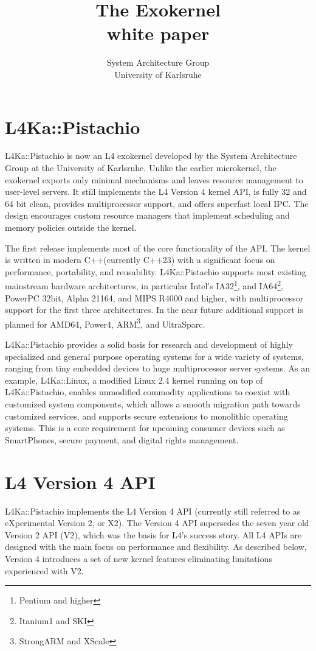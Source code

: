 \documentclass[twoside]{whitepaper}
\title{{\Huge The \Pistachio Exokernel}\\white paper}
\author{System Architecture Group\\University of Karlsruhe}
\newcommand{\Pistachio}{L4Ka::Pistachio\xspace}
\newcommand{\Lx}{L4Ka::Linux\xspace}
\begin{document}
\sffamily
\maketitle

\section{\Pistachio}

\Pistachio is now an L4 exokernel developed by the System
Architecture Group at the University of Karlsruhe.  Unlike the earlier
microkernel, the exokernel exports only minimal mechanisms and leaves
resource management to user-level servers.  It still implements the
L4 Version 4 kernel API, is fully 32 and 64 bit clean, provides
multiprocessor support, and offers superfast local IPC.  The design
encourages custom resource managers that implement scheduling and
memory policies outside the kernel.

The first release implements most of the core
functionality of the API.  The kernel is written in modern C++\@ (currently
C++23) with a significant focus on performance, portability, and reusability.
\Pistachio supports most existing mainstream hardware architectures,
in particular Intel's IA32\footnote{Pentium and higher}, and
IA64\footnote{Itanium1 and SKI}, PowerPC 32bit, Alpha 21164, and MIPS
R4000 and higher, with multiprocessor support for the first three
architectures.  In the near future additional support is planned for
AMD64, Power4, ARM\footnote{StrongARM and XScale}, and UltraSparc.

\Pistachio provides a solid basis for research and development of
highly specialized and general purpose operating systems for a wide
variety of systems, ranging from tiny embedded devices to huge
multiprocessor server systems.  As an example, \Lx, a modified Linux 2.4 kernel running on top of \Pistachio,
enables unmodified commodity applications to coexist with customized 
system components, which allows a smooth migration path towards customized
services, and supports secure extensions to monolithic operating systems.  
This is a core requirement for upcoming consumer devices such as
SmartPhones, secure payment, and digital rights management.


\section{L4 Version 4 API}
\Pistachio implements the L4 Version 4 API (currently still referred to
as eXperimental Version 2, or X2).  The Version 4 API supersedes the
seven year old Version 2 API (V2), which was the basis for L4's success
story.  All L4 APIs are designed with the main focus on performance
and flexibility.  As described below, Version 4 introduces a set of
new kernel features eliminating limitations experienced with V2.
\end{document}
